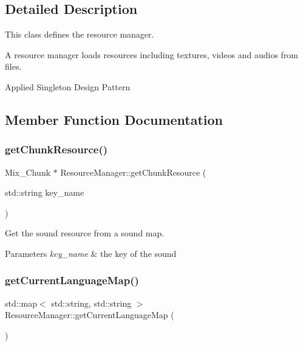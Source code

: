 \subsection{Detailed Description}
This class defines the resource manager. 

A resource manager loads resources including textures, videos and audios from files.

Applied Singleton Design Pattern 

\subsection{Member Function Documentation}
\mbox{\label{class_resource_manager_a68e2e20a3c93082296f6a71b19c6f59f}} 
\subsubsection{\texorpdfstring{get\+Chunk\+Resource()}{getChunkResource()}}
{\footnotesize\ttfamily Mix\+\_\+\+Chunk $\ast$ Resource\+Manager\+::get\+Chunk\+Resource (\begin{DoxyParamCaption}\item[{std\+::string}]{key\+\_\+name }\end{DoxyParamCaption})}



Get the sound resource from a sound map. 


\begin{DoxyParams}{Parameters}
{\em key\+\_\+name} & the key of the sound \\
\hline
\end{DoxyParams}
\mbox{\label{class_resource_manager_acab1c7790fd7571c07766e7426fc05ce}} 
\subsubsection{\texorpdfstring{get\+Current\+Language\+Map()}{getCurrentLanguageMap()}}
{\footnotesize\ttfamily std\+::map$<$ std\+::string, std\+::string $>$ Resource\+Manager\+::get\+Current\+Language\+Map (\begin{DoxyParamCaption}{ }\end{DoxyParamCaption})}

